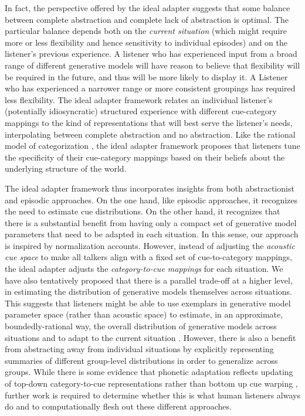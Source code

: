 In fact, the perspective offered by the ideal adapter suggests that some balance between complete abstraction and complete lack of abstraction is optimal.  The particular balance depends both on the \emph{current situation} (which might require more or less flexibility and hence sensitivity to individual episodes) and on the listener's previous experience.  A listener who has experienced input from a broad range of different generative models will have reason to believe that flexibility will be required in the future, and thus will be more likely to display it.  A Listener who has experienced a narrower range or more consistent groupings has required less flexibility.  The ideal adapter framework relates an individual listener's (potentially idiosyncratic) structured experience with different cue-category mappings to the kind of representations that will best serve the listener's needs, interpolating between complete abstraction and no abstraction. Like the rational model of categorization \autocite{Anderson1991}, the ideal adapter framework proposes that listeners tune the specificity of their cue-category mappings based on their beliefs about the underlying structure of the world.

\label{r1-shi-et-al}
The ideal adapter framework thus incorporates insights from both abstractionist and episodic approaches.  On the one hand, like episodic approaches, it recognizes the need to estimate cue distributions.  On the other hand, it recognizes that there is a substantial benefit from having only a compact set of generative model parameters that need to be adapted in each situation.
In this sense, our approach is inspired by normalization accounts.  However, instead of adjusting the \emph{acoustic cue space} to make all talkers align with a fixed set of cue-to-category mappings, the ideal adapter adjusts the \emph{category-to-cue mappings} for each situation.
We have also tentatively proposed that there is a parallel trade-off at a higher level, in estimating the distribution of generative models themselves across situations.  This suggests that listeners might be able to use exemplars in generative model parameter space (rather than acoustic space) to estimate, in an approximate, boundedly-rational way, the overall distribution of generative models across situations \autocite{Ashby1995,Gibson2013,Griffiths2008} and to adapt to the current situation \autocite{Shi2010}.  However, there is also a benefit from abstracting away from individual situations by explicitly representing summaries of different group-level distributions in order to generalize across groups.  While there is some evidence that phonetic adaptation reflects updating of top-down category-to-cue representations rather than bottom up cue warping \autocite{Dahan2008}, further work is required to determine whether this is  what human listeners always do and to computationally flesh out these different approaches.

